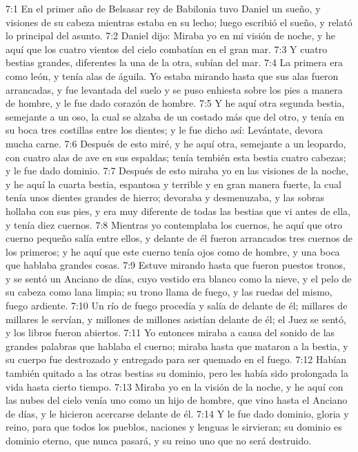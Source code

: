 7:1 En el primer año de Belsasar rey de Babilonia tuvo Daniel un sueño, y visiones de su cabeza mientras estaba en su lecho; luego escribió el sueño, y relató lo principal del asunto. 
7:2 Daniel dijo: Miraba yo en mi visión de noche, y he aquí que los cuatro vientos del cielo combatían en el gran mar. 
7:3 Y cuatro bestias grandes, diferentes la una de la otra, subían del mar. 
7:4 La primera era como león, y tenía alas de águila. Yo estaba mirando hasta que sus alas fueron arrancadas, y fue levantada del suelo y se puso enhiesta sobre los pies a manera de hombre, y le fue dado corazón de hombre. 
7:5 Y he aquí otra segunda bestia, semejante a un oso, la cual se alzaba de un costado más que del otro, y tenía en su boca tres costillas entre los dientes; y le fue dicho así: Levántate, devora mucha carne. 
7:6 Después de esto miré, y he aquí otra, semejante a un leopardo, con cuatro alas de ave en sus espaldas; tenía tembién esta bestia cuatro cabezas; y le fue dado dominio. 
7:7 Después de esto miraba yo en las visiones de la noche, y he aquí la cuarta bestia, espantosa y terrible y en gran manera fuerte, la cual tenía unos dientes grandes de hierro; devoraba y desmenuzaba, y las sobras hollaba con sus pies, y era muy diferente de todas las bestias que vi antes de ella, y tenía diez cuernos. 
7:8 Mientras yo contemplaba los cuernos, he aquí que otro cuerno pequeño salía entre ellos, y delante de él fueron arrancados tres cuernos de los primeros; y he aquí que este cuerno tenía ojos como de hombre, y una boca que hablaba grandes cosas. 
7:9 Estuve mirando hasta que fueron puestos tronos,  y se sentó un Anciano de días, cuyo vestido era blanco como la nieve, y el pelo de su cabeza como lana limpia; su trono llama de fuego, y las ruedas del mismo, fuego ardiente. 
7:10 Un río de fuego procedía y salía de delante de él; millares de millares le servían, y millones de millones asistían delante de él;  el Juez se sentó, y los libros fueron abiertos. 
7:11 Yo entonces miraba a causa del sonido de las grandes palabras que hablaba el cuerno; miraba hasta que mataron a la bestia, y su cuerpo fue destrozado y entregado para ser quemado en el fuego. 
7:12 Habían también quitado a las otras bestias su dominio, pero les había sido prolongada la vida hasta cierto tiempo. 
7:13 Miraba yo en la visión de la noche, y he aquí con las nubes del cielo venía uno como un hijo de hombre, que vino hasta el Anciano de días, y le hicieron acercarse delante de él. 
7:14 Y le fue dado dominio, gloria y reino, para que todos los pueblos, naciones y lenguas le sirvieran;  su dominio es dominio eterno, que nunca pasará, y su reino uno que no será destruido. 
